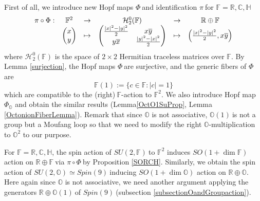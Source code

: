 \documentclass[a4paper]{article}%
\begin{document}
First of all, we introduce new Hopf maps $\Phi\ $and identification $\pi\ $for
$\mathbb{F}=\mathbb{R},\mathbb{C},\mathbb{H}$
\[%
\begin{array}
[c]{cccccc}%
\pi\circ\Phi: & \mathbb{F}^{2} & \rightarrow & \mathcal{H}_{2}^{0}%
(\mathbb{F}) & \rightarrow & \mathbb{R}\oplus\mathbb{F}\\
&
\begin{pmatrix}
x\\
y
\end{pmatrix}
& \mapsto &
\begin{pmatrix}
\frac{|x|^{2}-|y|^{2}}{2} & x\overline{y}\\
y\overline{x} & \frac{|y|^{2}-|x|^{2}}{2}%
\end{pmatrix}
& \mapsto & \left(  \frac{|x|^{2}-|y|^{2}}{2},x\overline{y}\right)
\end{array}
\]
where $\mathcal{H}_{2}^{0}(\mathbb{F})$ is the space of $2\times2$ Hermitian
traceless matrices over $\mathbb{F}$. By Lemma \ref{surjection}, the Hopf maps
$\Phi\ $are surjective, and the generic fibers of $\Phi$ are
\[
\mathbb{F}(1):=\{c\in\mathbb{F}:|c|=1\}
\]
which are compatible to the (right)$\ \mathbb{F}$-action to $\mathbb{F}^{2}$.
We also introduce Hopf map $\Phi_{\mathbb{O}}$ and obtain the similar results
(Lemma\ref{OctO1SuProp}, Lemma \ref{OctonionFiberLemma}). Remark that since
$\mathbb{O}$ is not associative, $\mathbb{O}(1)\ $is not a group but a Moufang
loop so that we need to modify the right $\mathbb{O}$-multiplication to
$\mathbb{O}^{2}$ to our purpose.

For $\mathbb{F}=\mathbb{R},\mathbb{C},\mathbb{H}$, the spin action of
$SU(2,\mathbb{F})\ $to $\mathbb{F}^{2}$ induces $SO\left(  1+\dim
\mathbb{F}\right)  $ action on $\mathbb{R}\oplus\mathbb{F\ }$via $\pi\circ
\Phi\ $by Proposition \ref{SORCH}. Similarly, we obtain the spin action of
$SU(2,\mathbb{O})\simeq Spin\left(  9\right)  \ $inducing $SO\left(
1+\dim\mathbb{O}\right)  $ action on $\mathbb{R}\oplus\mathbb{O}$. Here again
since $\mathbb{O}$ is not associative, we need another argument applying the
generators $\mathbb{R}\oplus\mathbb{O}\left(  1\right)  \ $of $Spin\left(
9\right)  \ $(subsection \ref{subsectionOandGroupaction}).
\end{document}
